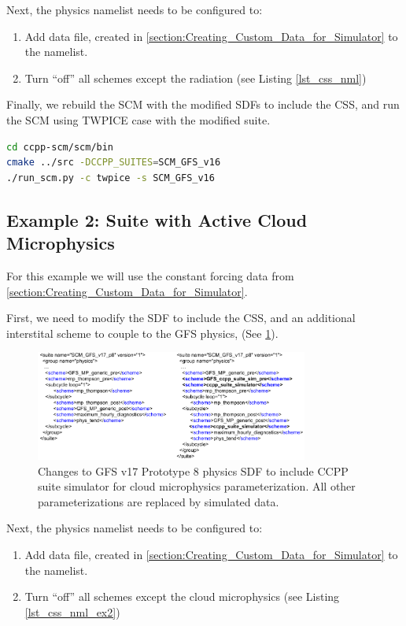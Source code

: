 Next, the physics namelist needs to be configured to:
\begin{enumerate}
\item Add data file,  created in \ref{section:Creating_Custom_Data_for_Simulator} to the namelist.
\item Turn ``off'' all schemes except the radiation (see Listing \ref{lst_css_nml})
\end{enumerate}

Finally, we rebuild the SCM with the modified SDFs to include the CSS, and run the SCM  using TWPICE case with the modified  suite.
\begin{lstlisting}[language=bash]
cd ccpp-scm/scm/bin
cmake ../src -DCCPP_SUITES=SCM_GFS_v16
./run_scm.py -c twpice -s SCM_GFS_v16
\end{lstlisting}

\subsection{Example 2: Suite with Active Cloud Microphysics}
\label{section:Suite_with_Active_cldmp}

For this example we will use the constant forcing data from \ref{section:Creating_Custom_Data_for_Simulator}.

First, we need to modify the SDF to include the CSS,  and an additional interstital scheme to couple to the GFS physics,  (See \ref{fig:CSS_SDF_ex2}).

\begin{figure}[h]
    \centering
    \includegraphics[width=0.80\textwidth]{images/SDF_changes_for_CSS_ex2.png}
    \caption{Changes to GFS v17 Prototype 8 physics SDF to include CCPP suite simulator for  cloud microphysics parameterization. All other parameterizations are replaced by simulated data.}
    \label{fig:CSS_SDF_ex2}
\end{figure}

Next, the physics namelist needs to be configured to:
\begin{enumerate}
\item Add data file,  created in \ref{section:Creating_Custom_Data_for_Simulator} to the namelist.
\item Turn ``off'' all schemes except the cloud microphysics (see Listing \ref{lst_css_nml_ex2})
\end{enumerate}


